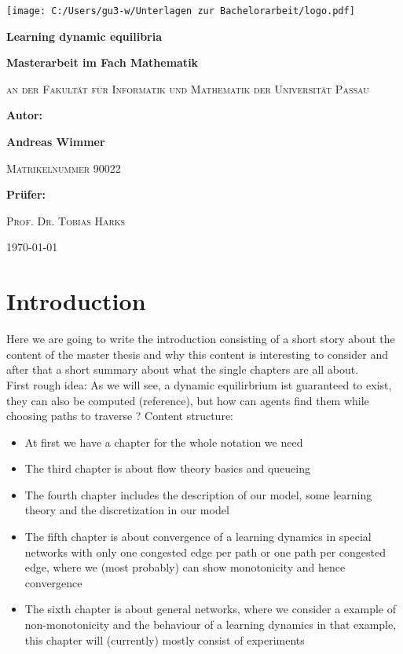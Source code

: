 \documentclass[reqno,openany]{amsbook}
\theoremstyle{definition}
\theoremstyle{plain}
\begin{document}
\begin{titlepage}
	\centering
	\texttt{[image: C:/Users/gu3-w/Unterlagen zur Bachelorarbeit/logo.pdf]}\par
	\vspace{0.5cm}
	{\LARGE\bfseries Learning dynamic equilibria \par}
	\vspace{1cm}
	{\Large\bfseries Masterarbeit im Fach Mathematik\par}
	\vspace{0.1cm}
	{\scshape \large an der Fakultät für Informatik und Mathematik der Universität Passau\par}
	\vspace{2cm}
	{\Large \bfseries Autor:\par}
	\vspace{0.1cm}
	{\Large \bfseries Andreas Wimmer\par}
	\vspace{0.1cm}
	{\scshape \Large Matrikelnummer 90022\par}
	\vspace{2cm}
	{\Large\bfseries Prüfer: \par}
	\vspace{0.1cm}
	{\scshape \Large Prof. Dr. Tobias Harks\par}
	\vfill
	{\large \today\par}
\end{titlepage}	
\tableofcontents
\newpage
\chapter{Introduction}
Here we are going to write the introduction consisting of a short story about the content of the master thesis and why this content is interesting to consider and after that a short summary about what the single chapters are all about. \\
First rough idea: As we will see, a dynamic equilirbrium ist guaranteed to exist, they can also be computed (reference), but how can agents find them while choosing paths to traverse ?
Content structure:
\begin{itemize}
	\item{At first we have a chapter for the whole notation we need}
	\item{The third chapter is about flow theory basics and queueing}
	\item{The fourth chapter includes the description of our model, some learning theory and the discretization in our model}
	\item{The fifth chapter is about convergence of a learning dynamics in special networks with only one congested edge per path or one path per congested edge, where we (most probably) can show monotonicity and hence convergence}
	\item{The sixth chapter is about general networks, where we consider a example of non-monotonicity and the behaviour of a learning dynamics in that example, this chapter will (currently) mostly consist of experiments}
\end{itemize}
\end{document}
